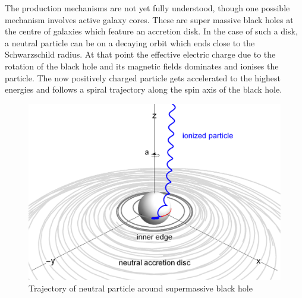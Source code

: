 \documentclass[abstract,toc,los,lof,english,10pt,glossary,acronyms]{jluthesis}
\begin{document}
The production mechanisms are not yet fully understood, though one possible mechanism involves active galaxy cores.
These are super massive black holes at the centre of galaxies which feature an accretion disk. In the case of such a disk, a neutral particle can be on a decaying orbit which ends close to the Schwarzschild radius. At that point the effective electric charge due to the rotation of the black hole and its magnetic fields dominates and ionises the particle. The now positively charged particle gets accelerated to the highest energies and follows a spiral trajectory along the spin axis of the black hole.\cite{Tursunov_2020}
\begin{figure}[ht!]
	\centering
	\includegraphics[width=0.5\linewidth]{data/uhecr-sm-bh}
	\caption{Trajectory of neutral particle around supermassive black hole \cite{Tursunov_2020}}
	\label{fig:uhecr-sm-bh}
\end{figure}\\
\end{document}
